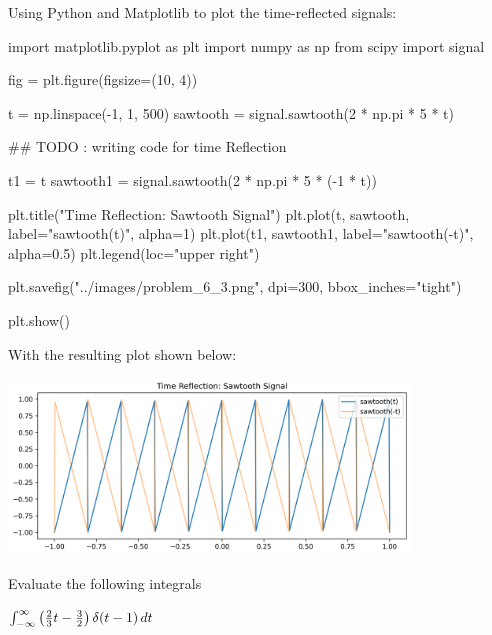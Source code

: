 \documentclass[a4paper, 10pt]{article}
\begin{document}
\begin{solution}
Using Python and Matplotlib to plot the time-reflected signals:
\begin{codingbox}
import matplotlib.pyplot as plt
import numpy as np
from scipy import signal

fig = plt.figure(figsize=(10, 4))

t = np.linspace(-1, 1, 500)
sawtooth = signal.sawtooth(2 * np.pi * 5 * t)

## TODO : writing code for time Reflection

t1 = t
sawtooth1 = signal.sawtooth(2 * np.pi * 5 * (-1 * t))

plt.title("Time Reflection: Sawtooth Signal")
plt.plot(t, sawtooth, label="sawtooth(t)", alpha=1)
plt.plot(t1, sawtooth1, label="sawtooth(-t)", alpha=0.5)
plt.legend(loc="upper right")

plt.savefig("../images/problem_6_3.png", dpi=300, bbox_inches="tight")

plt.show()
\end{codingbox}

With the resulting plot shown below:
\begin{center}
    \includegraphics[width=0.8\textwidth]{images/problem_6_3.png}
\end{center}
\end{solution}

\newpage

\begin{problem}[9]
Evaluate the following integrals
\end{problem}

\begin{subproblems}
    \item \( \int_{-\infty}^{\infty} \left(\frac{2}{3}t-\frac{3}{2}\right) \delta(t-1) \,dt \)
\end{subproblems}
\end{document}

